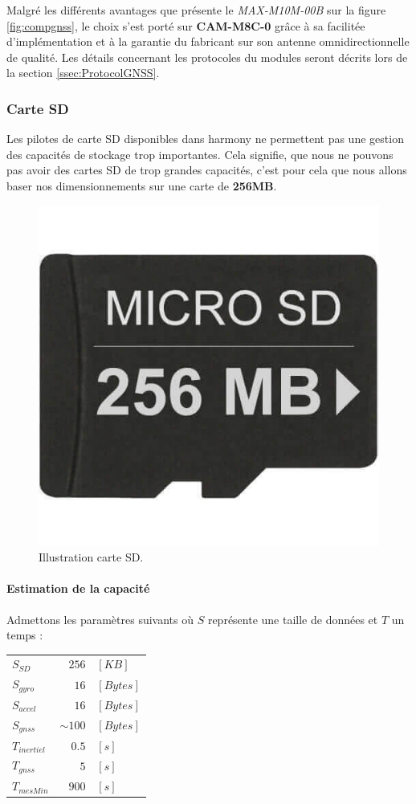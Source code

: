Malgré les différents avantages que présente le \textit{MAX-M10M-00B} sur la figure \ref{fig:compgnss}, le choix s'est porté sur \textbf{CAM-M8C-0} grâce à sa facilitée d'implémentation et à la garantie du fabricant sur son antenne omnidirectionnelle de qualité. Les détails concernant les protocoles du modules seront décrits lors de la section \ref{ssec:ProtocolGNSS}.

\clearpage

\subsubsection{Carte SD} 
Les pilotes de carte SD disponibles dans \gls{harmony} ne permettent pas une gestion des capacités de stockage trop importantes. Cela signifie, que nous ne pouvons pas avoir des cartes SD de trop grandes capacités, c'est pour cela que nous allons baser nos dimensionnements sur une carte de \textbf{256MB}. 

\begin{figure}[h]
	\centering
	\includegraphics[width=0.2\linewidth]{../figures/pre_etude/CarteSD_Illustration}
	\caption{Illustration carte SD.}
	\label{fig:cartesdillustration}
\end{figure}


\paragraph{Estimation de la capacité} Admettons les paramètres suivants où $S$ représente une taille de données et $T$ un temps :

\begin{tabular}{lrl}
	$S_{SD}$ & $256$ & $[KB]$ \\
	$S_{gyro}$ & $16$ & $[Bytes]$ \\
	$S_{accel}$ & $16$ & $[Bytes]$ \\
	$S_{gnss}$ & $\sim100$ & $[Bytes]$ \\
	$T_{inertiel}$ & $0.5$ & $[s]$ \\
	$T_{gnss}$ & $5$ & $[s]$ \\
	$T_{mesMin}$ & $900$ & $[s]$ \\
\end{tabular}

